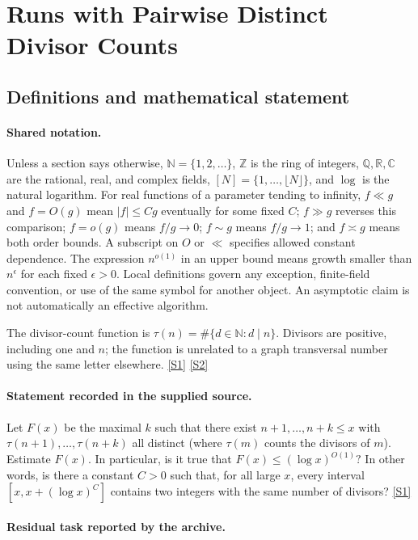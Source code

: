 \documentclass[11pt,a4paper]{article}
\newcommand{\N}{\mathbb{N}}
\newcommand{\Z}{\mathbb{Z}}
\newcommand{\Q}{\mathbb{Q}}
\newcommand{\R}{\mathbb{R}}
\newcommand{\C}{\mathbb{C}}
\newcommand{\sref}[2]{\hyperlink{source:#1:#2}{[S#2]}}
\begin{document}
\section{Runs with Pairwise Distinct Divisor Counts}\label{statement}


\subsection{Definitions and mathematical statement}

\paragraph{Shared notation.}Unless a section says otherwise, $\N=\{1,2,\ldots\}$,
$\Z$ is the ring of integers, $\Q,\R,\C$ are the rational, real, and complex
fields, $[N]=\{1,\ldots,\lfloor N\rfloor\}$, and $\log$ is the natural
logarithm. For real functions of a parameter tending to infinity,
$f\ll g$ and $f=O(g)$ mean $|f|\leq Cg$ eventually for some fixed $C$;
$f\gg g$ reverses this comparison; $f=o(g)$ means $f/g\to0$;
$f\sim g$ means $f/g\to1$; and $f\asymp g$ means both order bounds.
A subscript on $O$ or $\ll$ specifies allowed constant dependence.
The expression $n^{o(1)}$ in an upper bound means growth smaller than
$n^\epsilon$ for each fixed $\epsilon>0$. Local definitions govern any
exception, finite-field convention, or use of the same symbol for another
object. An asymptotic claim is not automatically an effective algorithm.



The divisor-count function is $\tau(n)=\#\{d\in\N:d\mid n\}$. Divisors are positive, including one and $n$; the function is unrelated to a graph transversal number using the same letter elsewhere. \sref{statement}{1} \sref{statement}{2}

\paragraph{Statement recorded in the supplied source.}
Let $F(x)$ be the maximal $k$ such that there exist $n+1,\ldots,n+k\leq x$ with $\tau(n+1),\ldots,\tau(n+k)$ all distinct (where $\tau(m)$ counts the divisors of $m$). Estimate $F(x)$. In particular, is it true that $ F(x) \leq (\log x)^{O(1)}? $ In other words, is there a constant $C>0$ such that, for all large $x$, every interval $[x,x+(\log x)^C]$ contains two integers with the same number of divisors? \sref{statement}{1}

\paragraph{Residual task reported by the archive.}
\end{document}
